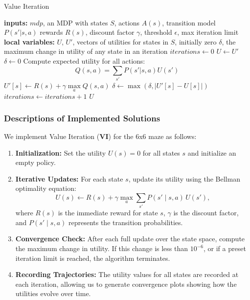 \documentclass[11pt]{article}
\begin{document}
\begin{algorithm}
\caption{Value Iteration}
\label{alg:value_iteration}
\begin{algorithmic}[1]
        \State \textbf{inputs:} $mdp$, an MDP with states $S$, actions $A(s)$, transition model $P(s'|s,a)$
        \State \hspace{11mm} rewards $R(s)$, discount factor $\gamma$, threshold $\epsilon$, max iteration limit
        \State \textbf{local variables:} 
        \Indent
            \State $U$, $U'$, vectors of utilities for states in $S$, initially zero
            \State $\delta$, the maximum change in utility of any state in an iteration
            \State $iterations \gets 0$
        \EndIndent
        \Repeat
            \State $U \gets U'$
            \State $\delta \gets 0$
                \State Compute expected utility for all actions:
                \[
                Q(s, a) = \sum_{s'} P(s' | s, a) U(s')
                \]
                \State $U'[s] \gets R(s) + \gamma \max\limits_{a} Q(s, a)$
                \State $\delta \gets \max(\delta, |U'[s] - U[s]|)$
            \EndFor
            \State $iterations \gets iterations + 1$
        \State \Return $U$
    \EndFunction
\end{algorithmic}
\end{algorithm}

\newpage
\subsubsection{Descriptions of Implemented Solutions}
We implement Value Iteration (\textbf{VI}) for the 6x6 maze as follows:
\begin{enumerate}
    \item \textbf{Initialization:} Set the utility $U(s) = 0$ for all states $s$ and initialize an empty policy.
    \item \textbf{Iterative Updates:} For each state $s$, update its utility using the Bellman optimality equation:
    \[
    U(s) \leftarrow R(s) + \gamma \max_a \sum_{s'} P(s' \mid s,a)\,U(s'),
    \]
    where $R(s)$ is the immediate reward for state $s$, $\gamma$ is the discount factor, and $P(s' \mid s,a)$ represents the transition probabilities.
    \item \textbf{Convergence Check:} After each full update over the state space, compute the maximum change in utility. If this change is less than $10^{-6}$, or if a preset iteration limit is reached, the algorithm terminates.
    \item \textbf{Recording Trajectories:} The utility values for all states are recorded at each iteration, allowing us to generate convergence plots showing how the utilities evolve over time.
\end{enumerate}
\end{document}
